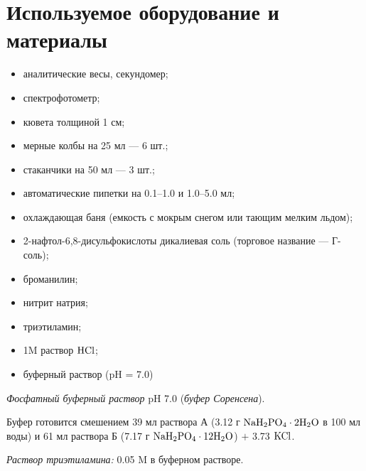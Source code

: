 \documentclass[a4paper]{article}
\begin{document}
\section{\LARGE \textbf{Используемое оборудование и материалы}}
\textbf{}
    \begin{itemize}
        \item аналитические весы, секундомер;
        \item спектрофотометр;
        \item кювета толщиной 1 см;
        \item мерные колбы на 25 мл --- 6 шт.;
        \item стаканчики на 50 мл --- 3 шт.;
        \item автоматические пипетки на 0.1--1.0 и 1.0--5.0 мл;
        \item  охлаждающая баня (емкость с мокрым снегом или тающим мелким льдом);
        \item 2-нафтол-6,8-дисульфокислоты дикалиевая соль (торговое название --- Г-соль);
        \item броманилин;
        \item нитрит натрия;
        \item триэтиламин;
        \item 1M раствор $\rm HCl$;
        \item буферный раствор (pH = 7.0)
        \end{itemize}  
\par \vspace{1 cm}


\textbf{}
\par \vspace{0.2 cm}

 \hspace{0.1 cm} \textit{Фосфатный буферный раствор} pH 7.0 (\textit{буфер Соренсена}). \par \vspace{0.2 cm}
Буфер готовится смешением 39 мл раствора А (3.12 г $\rm NaH_2PO_4 \cdot 2H_2O$ в 100 мл воды) и 61 мл раствора Б (7.17 г $\rm NaH_2PO_4 \cdot 12H_2O$) $+$ 3.73 $\rm KCl$. \par \vspace{0.2 cm}

 \hspace{0.1 cm} \textit{Раствор триэтиламина:} 0.05 M в буферном растворе. \par \vspace{0.2 cm}
\end{document}
